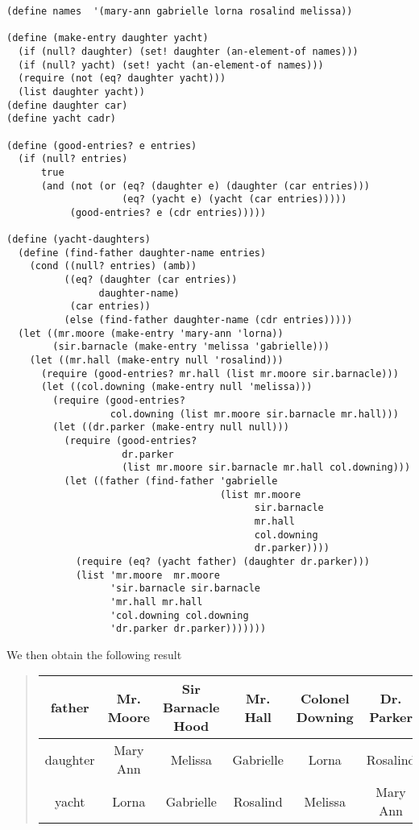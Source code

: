 \documentclass[a4paper,12pt]{article}
\begin{document}
\begin{lstlisting}
(define names  '(mary-ann gabrielle lorna rosalind melissa))

(define (make-entry daughter yacht)
  (if (null? daughter) (set! daughter (an-element-of names)))
  (if (null? yacht) (set! yacht (an-element-of names)))
  (require (not (eq? daughter yacht)))
  (list daughter yacht))
(define daughter car)
(define yacht cadr)

(define (good-entries? e entries)
  (if (null? entries)
      true
      (and (not (or (eq? (daughter e) (daughter (car entries)))
                    (eq? (yacht e) (yacht (car entries)))))
           (good-entries? e (cdr entries)))))

(define (yacht-daughters)
  (define (find-father daughter-name entries)
    (cond ((null? entries) (amb))
          ((eq? (daughter (car entries))
                daughter-name)
           (car entries))
          (else (find-father daughter-name (cdr entries)))))
  (let ((mr.moore (make-entry 'mary-ann 'lorna))
        (sir.barnacle (make-entry 'melissa 'gabrielle)))
    (let ((mr.hall (make-entry null 'rosalind)))
      (require (good-entries? mr.hall (list mr.moore sir.barnacle)))
      (let ((col.downing (make-entry null 'melissa)))
        (require (good-entries?
                  col.downing (list mr.moore sir.barnacle mr.hall)))
        (let ((dr.parker (make-entry null null)))
          (require (good-entries?
                    dr.parker
                    (list mr.moore sir.barnacle mr.hall col.downing)))
          (let ((father (find-father 'gabrielle
                                     (list mr.moore
                                           sir.barnacle
                                           mr.hall
                                           col.downing
                                           dr.parker))))
            (require (eq? (yacht father) (daughter dr.parker)))
            (list 'mr.moore  mr.moore
                  'sir.barnacle sir.barnacle
                  'mr.hall mr.hall
                  'col.downing col.downing
                  'dr.parker dr.parker)))))))
\end{lstlisting}

We then obtain the following result

\begin{quote}
  \begin{tabular}{|c|c|c|c|c|c|}
    \hline
    father&Mr. Moore& Sir Barnacle Hood& Mr. Hall& Colonel Downing&
    Dr. Parker \\ \hline
    daughter& Mary Ann& Melissa& Gabrielle & Lorna& Rosalind \\ \hline
    yacht& Lorna& Gabrielle& Rosalind & Melissa & Mary Ann \\ \hline
  \end{tabular}
\end{quote}
\end{document}
